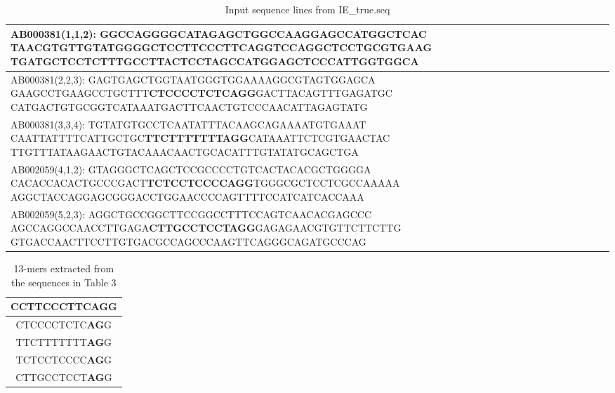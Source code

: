 \documentclass[12pt,a4paper]{article}
\begin{document}
	\begin{table}[H]
		\caption{Input sequence lines from IE\_true.seq}
		\begin{tabular}{ | p{\linewidth} |}
			\hline
			AB000381(1,1,2): GGCCAGGGGCATAGAGCTGGCCAAGGAGCCATGGCTCAC\newline
			TAACGTGTTGTATGGGGCT\textbf{CCTTCCCTTCAGG}TCCAGGCTCCTGCGTGAAG\newline
			TGATGCTCCTCTTTGCCTTACTCCTAGCCATGGAGCTCCCATTGGTGGCA \\
			\hline
			AB000381(2,2,3): GAGTGAGCTGGTAATGGGTGGAAAAGGCGTAGTGGAGCA\newline
			GAAGCCTGAAGCCTGCTTT\textbf{CTCCCCTCTCAGG}GACTTACAGTTTGAGATGC\newline
			CATGACTGTGCGGTCATAAATGACTTCAACTGTCCCAACATTAGAGTATG \\
			\hline
			AB000381(3,3,4): TGTATGTGCCTCAATATTTACAAGCAGAAAATGTGAAAT\newline
			CAATTATTTTCATTGCTGC\textbf{TTCTTTTTTTAGG}CATAAATTCTCGTGAACTAC\newline
			TTGTTTATAAGAACTGTACAAACAACTGCACATTTGTATATGCAGCTGA \\
			\hline
			AB002059(4,1,2): GTAGGGCTCAGCTCCGCCCCTGTCACTACACGCTGGGGA\newline
			CACACCACACTGCCCGACT\textbf{TCTCCTCCCCAGG}TGGGCGCTCCTCGCCAAAAA\newline
			AGGCTACCAGGAGCGGGACCTGGAACCCCAGTTTTCCATCATCACCAAA \\
			\hline
			AB002059(5,2,3): AGGCTGCCGGCTTCCGGCCTTTCCAGTCAACACGAGCCC\newline
			AGCCAGGCCAACCTTGAGA\textbf{CTTGCCTCCTAGG}GAGAGAACGTGTTCTTCTTG\newline
			GTGACCAACTTCCTTGTGACGCCAGCCCAAGTTCAGGGCAGATGCCCAG \\
			\hline
		\end{tabular}
		\label{tab:ie_true}
	\end{table}
	
	\begin{table}[H]	
		\caption{13-mers extracted from the sequences in Table 3}	
		\begin{tabular}{ | c |}
			\hline
			CCTTCCCTTC\textbf{AG}G \\
			\hline
			CTCCCCTCTC\textbf{AG}G \\
			\hline
			TTCTTTTTTT\textbf{AG}G \\
			\hline
			TCTCCTCCCC\textbf{AG}G \\
			\hline
			CTTGCCTCCT\textbf{AG}G \\
			\hline
		\end{tabular}
		\centering
	\end{table}
\end{document}
